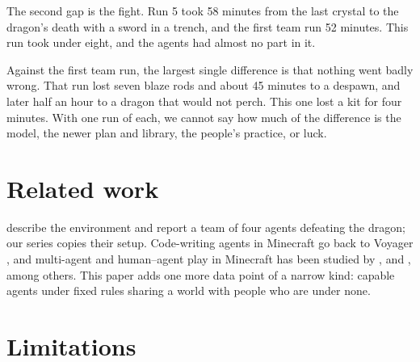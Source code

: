 \documentclass[11pt,a4paper]{article}
\begin{document}
The second gap is the fight. Run 5 took 58 minutes from the last crystal to the dragon's death with a sword in a trench, and the first team run 52 minutes. This run took under eight, and the agents had almost no part in it.

Against the first team run, the largest single difference is that nothing went badly wrong. That run lost seven blaze rods and about 45 minutes to a despawn, and later half an hour to a dragon that would not perch. This one lost a kit for four minutes. With one run of each, we cannot say how much of the difference is the model, the newer plan and library, the people's practice, or luck.

\section{Related work}

\citet{faldor2026team} describe the environment and report a team of four agents defeating the dragon; our series copies their setup. Code-writing agents in Minecraft go back to Voyager \citep{wang2024voyager}, and multi-agent and human--agent play in Minecraft has been studied by \citet{white2025collaborating}, \citet{altera2024sid} and \citet{gong2024mindagent}, among others. This paper adds one more data point of a narrow kind: capable agents under fixed rules sharing a world with people who are under none.

\section{Limitations}
\label{sec:limits}
\end{document}
